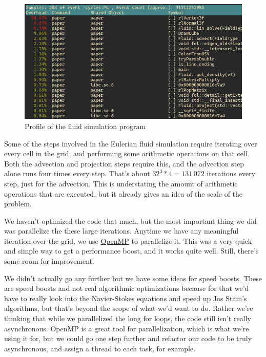 \documentclass[a4paper,12pt,titlepage]{article}
\begin{document}
\begin{figure}[H]
	\centering
	\includegraphics[width=\textwidth]{resources/profile.png}
	\caption{Profile of the fluid simulation program}
\end{figure}

Some of the steps involved in the Eulerian fluid simulation require iterating
over every cell in the grid, and performing some arithmetic operations on that cell.
Both the advection and projection steps require this, and the advection step
alone runs four times every step. That's about $32^3 * 4 = 131\,072$ iterations
every step, just for the advection. This is understating the amount of arithmetic
operations that are executed, but it already gives an idea of the scale of the
problem.

We haven't optimized the code that much, but the most important thing we did was
parallelize the these large iterations. Anytime we have any meaningful iteration
over the grid, we use \href{www.openmp.org}{OpenMP} to parallelize it. This was
a very quick and simple way to get a performance boost, and it works quite well.
Still, there's some room for improvement.

We didn't actually go any further but we have some ideas for speed boosts. These
are speed boosts and not real algorithmic optimizations because for that we'd have
to really look into the Navier-Stokes equations and speed up Jos Stam's algorithms,
but that's beyond the scope of what we'd want to do. Rather we're thinking that
while we parallelized the long for loops, the code still isn't really asynchronous.
OpenMP is a great tool for parallelization, which is what we're using it for,
but we could go one step further and refactor our code to be truly asynchronous,
and assign a thread to each task, for example.
\end{document}
